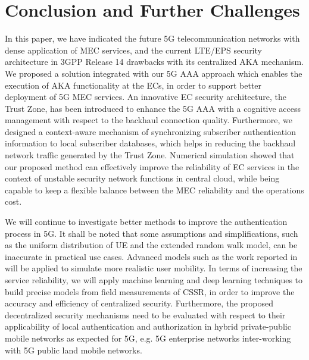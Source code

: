 \documentclass{ieeeaccess}
\newcommand{\change}[1]{#1}
\begin{document}
	\section{Conclusion and Further Challenges}\label{sec:conclusion}
	In this paper, we have indicated the future 5G telecommunication networks with dense application of MEC services, and the current LTE/EPS security architecture in 3GPP Release 14 drawbacks with its centralized AKA mechanism. We proposed a solution integrated with our 5G AAA approach which enables the execution of AKA \change{functionality} at the ECs, in order to support better deployment of 5G MEC services. An innovative EC security architecture, the Trust Zone, has been introduced to enhance the 5G AAA with a cognitive access management with respect to the backhaul connection quality. Furthermore, we designed a context-aware mechanism of synchronizing subscriber authentication information to local subscriber databases, which helps in reducing the backhaul network traffic generated by the Trust Zone. Numerical simulation showed that our proposed method can effectively improve the reliability of EC services in the context of unstable security network functions in central cloud, while being capable to keep a flexible balance between the MEC reliability and the operations cost.
	
	We will continue to investigate better methods to improve the authentication process in 5G. \change{It shall be noted that some assumptions and simplifications, such as the uniform distribution of \change{UE} and the extended random walk model, can be inaccurate in practical use cases. Advanced models such as the work reported in \cite{ye2018} will be applied to simulate more realistic user mobility.} In terms of increasing the service reliability, we will apply machine learning and deep learning techniques \change{to build precise models from field measurements of CSSR, in order} to improve the accuracy and efficiency of centralized security. Furthermore, the proposed decentralized security mechanisms need to be evaluated with respect to their applicability of local authentication and authorization in hybrid private-public mobile networks as expected for 5G, e.g. 5G enterprise networks inter-working with 5G public land mobile networks.
\end{document}
